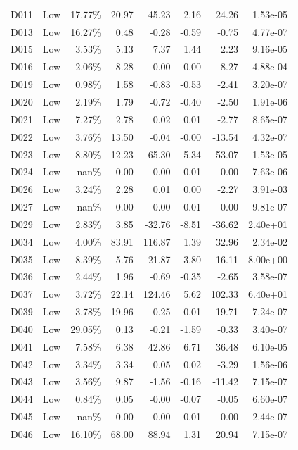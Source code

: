 \begin{tabular}{l l r r r r r r}
D011 & Low & 17.77\% & 20.97 & 45.23 & 2.16 & 24.26 & 1.53e-05 \\
D013 & Low & 16.27\% & 0.48 & -0.28 & -0.59 & -0.75 & 4.77e-07 \\
D015 & Low & 3.53\% & 5.13 & 7.37 & 1.44 & 2.23 & 9.16e-05 \\
D016 & Low & 2.06\% & 8.28 & 0.00 & 0.00 & -8.27 & 4.88e-04 \\
D019 & Low & 0.98\% & 1.58 & -0.83 & -0.53 & -2.41 & 3.20e-07 \\
D020 & Low & 2.19\% & 1.79 & -0.72 & -0.40 & -2.50 & 1.91e-06 \\
D021 & Low & 7.27\% & 2.78 & 0.02 & 0.01 & -2.77 & 8.65e-07 \\
D022 & Low & 3.76\% & 13.50 & -0.04 & -0.00 & -13.54 & 4.32e-07 \\
D023 & Low & 8.80\% & 12.23 & 65.30 & 5.34 & 53.07 & 1.53e-05 \\
D024 & Low & nan\% & 0.00 & -0.00 & -0.01 & -0.00 & 7.63e-06 \\
D026 & Low & 3.24\% & 2.28 & 0.01 & 0.00 & -2.27 & 3.91e-03 \\
D027 & Low & nan\% & 0.00 & -0.00 & -0.01 & -0.00 & 9.81e-07 \\
D029 & Low & 2.83\% & 3.85 & -32.76 & -8.51 & -36.62 & 2.40e+01 \\
D034 & Low & 4.00\% & 83.91 & 116.87 & 1.39 & 32.96 & 2.34e-02 \\
D035 & Low & 8.39\% & 5.76 & 21.87 & 3.80 & 16.11 & 8.00e+00 \\
D036 & Low & 2.44\% & 1.96 & -0.69 & -0.35 & -2.65 & 3.58e-07 \\
D037 & Low & 3.72\% & 22.14 & 124.46 & 5.62 & 102.33 & 6.40e+01 \\
D039 & Low & 3.78\% & 19.96 & 0.25 & 0.01 & -19.71 & 7.24e-07 \\
D040 & Low & 29.05\% & 0.13 & -0.21 & -1.59 & -0.33 & 3.40e-07 \\
D041 & Low & 7.58\% & 6.38 & 42.86 & 6.71 & 36.48 & 6.10e-05 \\
D042 & Low & 3.34\% & 3.34 & 0.05 & 0.02 & -3.29 & 1.56e-06 \\
D043 & Low & 3.56\% & 9.87 & -1.56 & -0.16 & -11.42 & 7.15e-07 \\
D044 & Low & 0.84\% & 0.05 & -0.00 & -0.07 & -0.05 & 6.60e-07 \\
D045 & Low & nan\% & 0.00 & -0.00 & -0.01 & -0.00 & 2.44e-07 \\
D046 & Low & 16.10\% & 68.00 & 88.94 & 1.31 & 20.94 & 7.15e-07 \\

\end{tabular}

